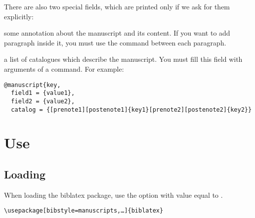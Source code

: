 \documentclass{ltxdockit}[2011/03/25]
\newcommand{\biblatex}{biblatex\xspace}
\begin{document}
There are also two special fields, which are printed only if we ask for them explicitly: 

\begin{fieldlist}
 some annotation about the manuscript and its content. If you want to add paragraph inside it, you must use the  command between each paragraph.

 a list of catalogues which describe the manuscript. You must fill this field with arguments of a  command. For example:

\begin{verbatim}
@manuscript{key,
  field1 = {value1},
  field2 = {value2},
  catalog = {[prenote1][postenote1]{key1}[prenote2][postenote2]{key2}}
\end{verbatim}
\end{fieldlist}


\section{Use}
\subsection{Loading}

When loading the \biblatex package, use the option  with value equal to .

\begin{verbatim}
\usepackage[bibstyle=manuscripts,…]{biblatex}
\end{verbatim}
\end{document}
